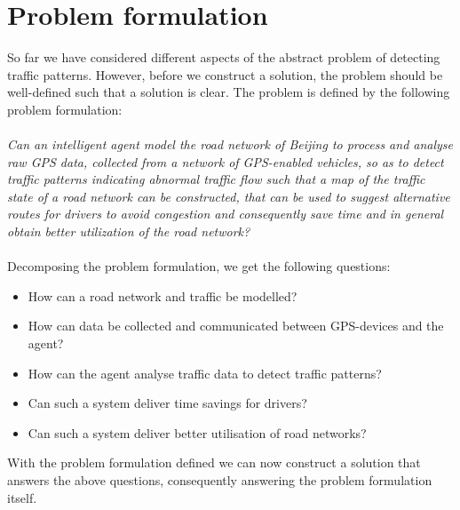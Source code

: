 \section{Problem formulation}
So far we have considered different aspects of the abstract problem of detecting traffic patterns. However, before we construct a solution, the problem should be well-defined such that a solution is clear. The problem is defined by the following problem formulation:
\\\\
\emph{Can an intelligent agent model the road network of Beijing to process and analyse raw GPS data, collected from a network of GPS-enabled vehicles, so as to detect traffic patterns indicating abnormal traffic flow such that a map of the traffic state of a road network can be constructed, that can be used to suggest alternative routes for drivers to avoid congestion and consequently save time and in general obtain better utilization of the road network?}
\\\\
Decomposing the problem formulation, we get the following questions:

\begin{itemize}
\item How can a road network and traffic be modelled?
\item How can data be collected and communicated between GPS-devices and the agent?
\item How can the agent analyse traffic data to detect traffic patterns?
\item Can such a system deliver time savings for drivers?
\item Can such a system deliver better utilisation of road networks?
\end{itemize}

With the problem formulation defined we can now construct a solution that answers the above questions, consequently answering the problem formulation itself.


% 